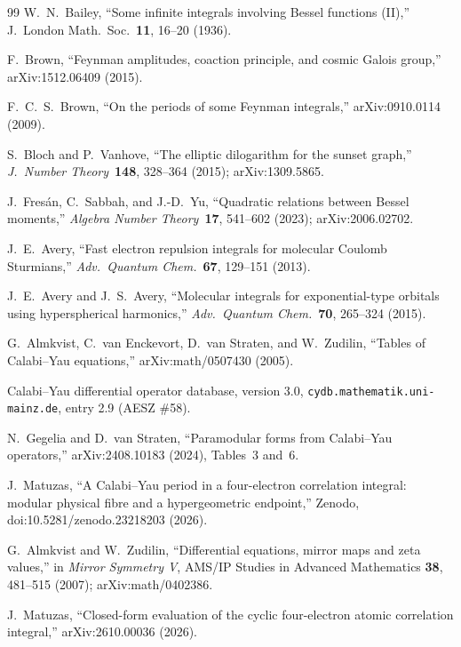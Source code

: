 \documentclass[aps,pra,twocolumn,superscriptaddress,longbibliography]{revtex4-2}
\begin{document}
\begin{thebibliography}{99}
W.~N.~Bailey, ``Some infinite integrals involving Bessel functions (II),''
J.\ London Math.\ Soc.\ \textbf{11}, 16--20 (1936).

F.~Brown, ``Feynman amplitudes, coaction principle, and cosmic Galois
group,'' arXiv:1512.06409 (2015).

F.~C.~S.~Brown, ``On the periods of some Feynman integrals,'' arXiv:0910.0114 (2009).

S.~Bloch and P.~Vanhove, ``The elliptic dilogarithm for the sunset graph,''
\textit{J.\ Number Theory}\ \textbf{148}, 328--364 (2015); arXiv:1309.5865.

J.~Fres\'an, C.~Sabbah, and J.-D.~Yu, ``Quadratic relations between Bessel
moments,'' \textit{Algebra Number Theory}\ \textbf{17}, 541--602 (2023);
arXiv:2006.02702.

J.~E.~Avery, ``Fast electron repulsion integrals for molecular Coulomb
Sturmians,'' \textit{Adv.\ Quantum Chem.}\ \textbf{67}, 129--151 (2013).

J.~E.~Avery and J.~S.~Avery, ``Molecular integrals for exponential-type orbitals
using hyperspherical harmonics,'' \textit{Adv.\ Quantum Chem.}\ \textbf{70},
265--324 (2015).

G.~Almkvist, C.~van Enckevort, D.~van Straten, and W.~Zudilin, ``Tables of
Calabi--Yau equations,'' arXiv:math/0507430 (2005).

Calabi--Yau differential operator database, version 3.0,
\texttt{cydb.mathematik.uni-mainz.de}, entry 2.9 (AESZ \#58).

N.~Gegelia and D.~van Straten, ``Paramodular forms from Calabi--Yau
operators,'' arXiv:2408.10183 (2024), Tables~3 and~6.

J.~Matuzas, ``A Calabi--Yau period in a four-electron correlation integral:
modular physical fibre and a hypergeometric endpoint,'' Zenodo,
doi:10.5281/zenodo.23218203 (2026).

G.~Almkvist and W.~Zudilin, ``Differential equations, mirror maps and zeta
values,'' in \textit{Mirror Symmetry V}, AMS/IP Studies in Advanced
Mathematics \textbf{38}, 481--515 (2007); arXiv:math/0402386.

J.~Matuzas, ``Closed-form evaluation of the cyclic four-electron atomic
correlation integral,'' arXiv:2610.00036 (2026).


\end{thebibliography}
\end{document}
